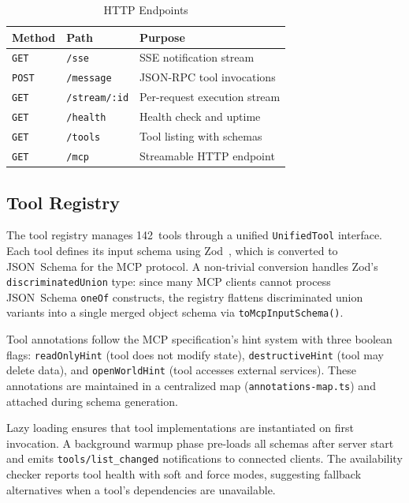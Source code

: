 \documentclass[journal,10pt]{IEEEtran}
\newcommand{\code}[1]{\texttt{#1}}
\begin{document}
\begin{table}[!t]
\centering
\caption{HTTP Endpoints}
\label{tab:endpoints}
\begin{tabular}{@{}llp{32mm}@{}}
\toprule
\textbf{Method} & \textbf{Path} & \textbf{Purpose} \\
\midrule
\texttt{GET}  & \texttt{/sse}        & SSE notification stream \\
\texttt{POST} & \texttt{/message}    & JSON-RPC tool invocations \\
\texttt{GET}  & \texttt{/stream/:id} & Per-request execution stream \\
\texttt{GET}  & \texttt{/health}     & Health check and uptime \\
\texttt{GET}  & \texttt{/tools}      & Tool listing with schemas \\
\texttt{GET}  & \texttt{/mcp}        & Streamable HTTP endpoint \\
\bottomrule
\end{tabular}
\end{table}

\subsection{Tool Registry}

The tool registry manages 142~tools through a unified \code{UnifiedTool} interface. Each tool defines its input schema using Zod~\cite{zod}, which is converted to JSON~Schema for the MCP protocol. A non-trivial conversion handles Zod's \code{discriminatedUnion} type: since many MCP clients cannot process JSON~Schema \code{oneOf} constructs, the registry flattens discriminated union variants into a single merged object schema via \code{toMcpInputSchema()}.

Tool annotations follow the MCP specification's hint system with three boolean flags: \code{readOnlyHint} (tool does not modify state), \code{destructiveHint} (tool may delete data), and \code{openWorldHint} (tool accesses external services). These annotations are maintained in a centralized map (\code{annotations-map.ts}) and attached during schema generation.

Lazy loading ensures that tool implementations are instantiated on first invocation. A background warmup phase pre-loads all schemas after server start and emits \code{tools/list\_changed} notifications to connected clients. The availability checker reports tool health with soft and force modes, suggesting fallback alternatives when a tool's dependencies are unavailable.
\end{document}

